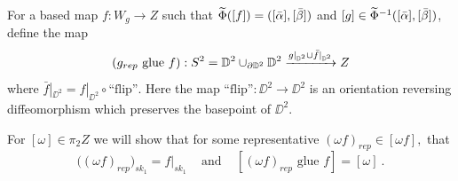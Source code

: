 \noindent For a based map $f: W_{g} \rightarrow Z$ such that $\widetilde{\Phi}([f]) = ([\bar{\alpha}] ,[\bar{\beta}])$ and $[g] \in \widetilde{\Phi}^{-1}([\bar{\alpha}] ,[\bar{\beta}])$, define the map
\[
(g_{rep} \text{ glue } f): S^{2} = \mathbb D^{2} \cup_{\partial \mathbb D^{2}} \mathbb D^{2} \xrightarrow{g|_{\mathbb D^{2}} \cup \bar{f}|_{\mathbb D^{2}}} Z
\]
where $\bar{f}|_{\DD^{2}} = f|_{\DD^{2}} \circ \text{``flip''}.$ Here the map $\text{``flip''}: \DD^{2} \rightarrow \DD^{2}$ is an orientation reversing diffeomorphism which preserves the basepoint of $\DD^{2}.$

\begin{lemma} \label{claim1} For $[\omega] \in \pi_{2}Z$ we will show that for some representative $(\omega f)_{rep} \in [\omega f],$ that 
\[
\big((\omega f)_{rep}\big)_{sk_{1}} = f|_{sk_{1}} \hspace{10pt} \text{ and } \hspace{10pt} [(\omega f)_{rep}  \text{ glue } f] = [\omega]~.
\]
\end{lemma}
